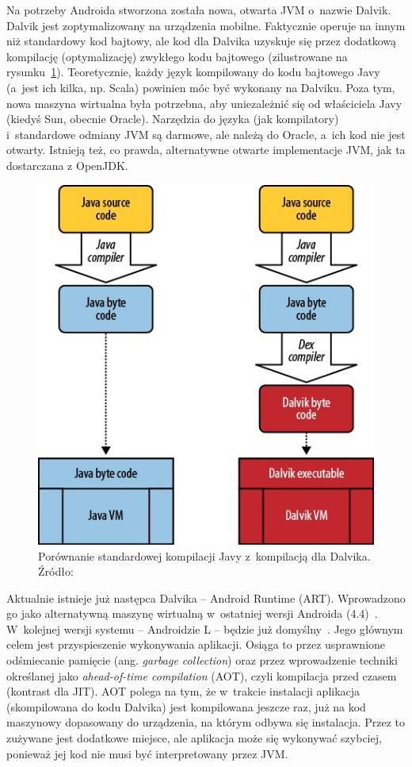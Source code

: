 Na potrzeby Androida stworzona została nowa, otwarta JVM o~nazwie Dalvik. Dalvik jest zoptymalizowany na urządzenia mobilne. Faktycznie operuje na innym niż standardowy kod bajtowy, ale kod dla Dalvika uzyskuje się przez dodatkową kompilację (optymalizację) zwykłego kodu bajtowego (zilustrowane na rysunku~\ref{fig:dalvik-compilation}). Teoretycznie, każdy język kompilowany do kodu bajtowego Javy (a~jest ich kilka, np. Scala) powinien móc być wykonany na Dalviku.
Poza tym, nowa maszyna wirtualna była potrzebna, aby uniezależnić się od właściciela Javy (kiedyś Sun, obecnie Oracle). Narzędzia do języka (jak kompilatory) i~standardowe odmiany JVM są darmowe, ale należą do Oracle, a~ich kod nie jest otwarty. Istnieją też, co prawda, alternatywne otwarte implementacje JVM, jak ta dostarczana z OpenJDK.

\begin{figure}
	\centering
		\includegraphics[scale=0.75]{img/dalvik-compilation.jpg}
	\caption{Porównanie standardowej kompilacji Javy z~kompilacją dla Dalvika. Źródło:~\cite{learning-android}}
	\label{fig:dalvik-compilation}
\end{figure}

Aktualnie istnieje już następca Dalvika -- Android Runtime (ART). Wprowadzono go jako alternatywną maszynę wirtualną w~ostatniej wersji Androida (4.4)~\cite{android-art}. W~kolejnej wersji systemu -- Androidzie L -- będzie już domyślny~\cite{android-l-preview}. Jego głównym celem jest przyspieszenie wykonywania aplikacji. Osiąga to przez usprawnione odśmiecanie pamięcie (ang. \emph{garbage collection}) oraz przez wprowadzenie techniki określanej jako \emph{ahead-of-time compilation} (AOT), czyli kompilacja przed czasem (kontrast dla JIT). AOT polega na tym, że w~trakcie instalacji aplikacja (skompilowana do kodu Dalvika) jest kompilowana jeszcze raz, już na kod maszynowy dopasowany do urządzenia, na którym odbywa się instalacja. Przez to zużywane jest dodatkowe miejsce, ale aplikacja może się wykonywać szybciej, ponieważ jej kod nie musi być interpretowany przez JVM.

